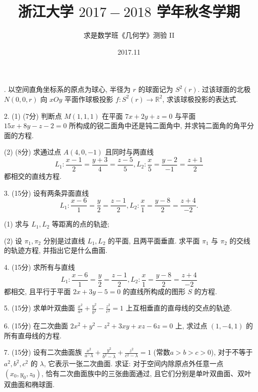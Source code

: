 \documentclass[UTF8]{ctexart}
\title{\textbf{浙江大学 $2017-2018$ 学年秋冬学期}}
\author{求是数学班《几何学》测验 II}
\date{2017.11}
\begin{document}
. 以空间直角坐标系的原点为球心, 半径为 $r$ 的球面记为 $S^2(r)$. 过该球面的北极 $N(0,0,r)$ 向 $xOy$ 平面作球极投影 $f:S^2(r)\rightarrow \mathbb{R}^2$, 求该球极投影的表达式.

2. (1) (7分) 判断点 $M(1,1,1)$ 在平面 $7x+2y+z=0$ 与平面 $15x+8y-z-2=0$ 所构成的锐二面角中还是钝二面角中, 并求钝二面角的角平分面的方程.

(2) (8分) 求通过点 $A(4,0,-1)$ 且同时与两直线 
\[
L_1:\frac{x-1}{2}=\frac{y+3}{4}=\frac{z-5}{5},L_2:\frac{x}{5}=\frac{y-2}{-1}=\frac{z+1}{2}
\]
都相交的直线方程.

3. (15分) 设有两条异面直线
\[
L_1:\frac{x-6}{1}=\frac{y}{2}=\frac{z-1}{2},L_2:\frac{x}{1}=\frac{y-8}{2}=\frac{z+4}{-2}.
\]

(1) 求与 $L_1,L_2$ 等距离的点的轨迹;

(2) 设 $\pi_1,\pi_2$ 分别是过直线 $L_1,L_2$ 的平面, 且两平面垂直. 求平面 $\pi_1$ 与 $\pi_2$ 的交线的轨迹方程, 并指出它是什么曲面.

4. (15分) 求所有与直线
\[
L_1:\frac{x-6}{1}=\frac{y}{2}=\frac{z-1}{2},L_2:\frac{x}{1}=\frac{y-8}{2}=\frac{z+4}{-2}
\]
都相交, 且平行于平面 $2x+3y-5=0$ 的直线所构成的图形 $S$ 的方程.

5. (15分) 求单叶双曲面 $\displaystyle\frac{x^2}{a^2}+\frac{y^2}{b^2}-\frac{z^2}{c^2}=1$ 上互相垂直的直母线的交点的轨迹.

6. (15分) 在二次曲面 $2x^2+y^2-z^2+3xy+xz-6z=0$ 上, 求过点 $(1,-4,1)$ 的所有直母线的方程.

7. (15分) 设有二次曲面族 $\displaystyle\frac{x^2}{a^-\lambda}+\frac{y^2}{b^2-\lambda}+\frac{z^2}{c^2-\lambda}=1$ (常数$a>b>c>0$), 对于不等于 $a^2,b^2,c^2$ 的 $\lambda$, 它表示一张二次曲面. 求证: 对于空间内除原点外任意一点 $(x_0,y_0,z_0)$, 恰有二次曲面族中的三张曲面通过, 且它们分别是单叶双曲面、双叶双曲面和椭球面.
\end{document}
